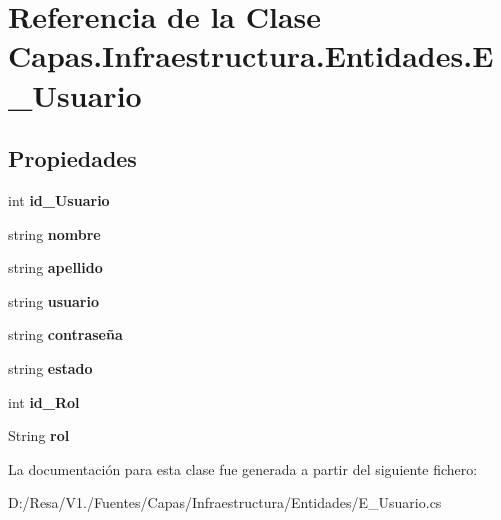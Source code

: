 \section{Referencia de la Clase Capas.\+Infraestructura.\+Entidades.\+E\+\_\+\+Usuario}
\label{class_capas_1_1_infraestructura_1_1_entidades_1_1_e___usuario}
\subsection*{Propiedades}
\begin{DoxyCompactItemize}
\item 
int {\bfseries id\+\_\+\+Usuario}\hspace{0.3cm}{\ttfamily  [get, set]}\label{class_capas_1_1_infraestructura_1_1_entidades_1_1_e___usuario_a2dd73f4c4a650565df441acca1806fe0}

\item 
string {\bfseries nombre}\hspace{0.3cm}{\ttfamily  [get, set]}\label{class_capas_1_1_infraestructura_1_1_entidades_1_1_e___usuario_a932b6bec563f1e7e938332e6b135036b}

\item 
string {\bfseries apellido}\hspace{0.3cm}{\ttfamily  [get, set]}\label{class_capas_1_1_infraestructura_1_1_entidades_1_1_e___usuario_ab669a7cb6005ac034eaf8fe2cd3e5df6}

\item 
string {\bfseries usuario}\hspace{0.3cm}{\ttfamily  [get, set]}\label{class_capas_1_1_infraestructura_1_1_entidades_1_1_e___usuario_a89e51c24db106f279df828e7fbf67384}

\item 
string {\bfseries contraseña}\hspace{0.3cm}{\ttfamily  [get, set]}\label{class_capas_1_1_infraestructura_1_1_entidades_1_1_e___usuario_ab222a6d1cb6ea571c69e343aeae9a2af}

\item 
string {\bfseries estado}\hspace{0.3cm}{\ttfamily  [get, set]}\label{class_capas_1_1_infraestructura_1_1_entidades_1_1_e___usuario_a663adeeeb25dad93de3b29c3b65713eb}

\item 
int {\bfseries id\+\_\+\+Rol}\hspace{0.3cm}{\ttfamily  [get, set]}\label{class_capas_1_1_infraestructura_1_1_entidades_1_1_e___usuario_aa281dac7d63d3682d22d73ba69ba7e03}

\item 
String {\bfseries rol}\hspace{0.3cm}{\ttfamily  [get, set]}\label{class_capas_1_1_infraestructura_1_1_entidades_1_1_e___usuario_ad5bfe85e0aeec82788005e80ecd461ad}

\end{DoxyCompactItemize}


La documentación para esta clase fue generada a partir del siguiente fichero\+:\begin{DoxyCompactItemize}
\item 
D\+:/\+Resa/\+V1./\+Fuentes/\+Capas/\+Infraestructura/\+Entidades/E\+\_\+\+Usuario.\+cs\end{DoxyCompactItemize}
